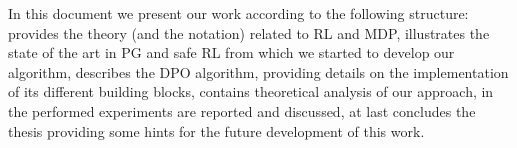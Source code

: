 \newline
In this document we present our work according to the following structure:  provides the theory (and the notation) related to \acf{RL} and \acf{MDP},  illustrates the state of the art in \acf{PG} and safe \ac{RL} from which we started to develop our algorithm,  describes the \ac{DPO} algorithm, providing details on the implementation of its different building blocks,  contains theoretical analysis of our approach, in  the performed experiments are reported and discussed, at last  concludes the thesis providing some hints for the future development of this work.